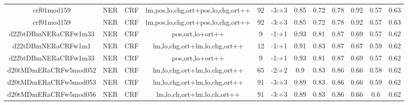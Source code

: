 \documentclass[a4paper]{article}
\begin{document}
\begin{landscape}
\begin{center}
\begin{tabular}{ |c|c|c|c|c|c|c|c|c|c|c|c|}
 	
 
 	
 		
 		\small{ crf01mod159 } & NER & CRF & lm,pos,lo,chg,ort+pos,lo,chg,ort++  &  92 &  -3:+3  &  0.85 & 0.72 & 0.78  &  0.92 & 0.57 & 0.63 \\
 		

 	
 
 	
 		
 		\small{ crf01mod159 } & NER & CRF & lm,pos,lo,chg,ort+pos,lo,chg,ort++  &  92 &  -3:+3  &  0.85 & 0.72 & 0.78  &  0.92 & 0.57 & 0.63 \\
 		

 	
 
 	
 		
 		\small{ d22btDBmNERaCRFw1m33 } & NER & CRF & pos,ort,lo+ort++  &  9 &  -1:+1  &  0.93 & 0.81 & 0.87  &  0.69 & 0.57 & 0.62 \\
 		

 	
 
 	
 		
 		\small{ d22tDBmNERaCRFw1m1 } & NER & CRF & lm,lo,chg,ort+lm,lo,chg,ort++  &  12 &  -1:+1  &  0.91 & 0.83 & 0.87  &  0.67 & 0.59 & 0.62 \\
 		

 	
 
 	
 		
 		\small{ d22btDBmNERaCRFw1m33 } & NER & CRF & pos,ort,lo+ort++  &  9 &  -1:+1  &  0.93 & 0.81 & 0.87  &  0.69 & 0.57 & 0.62 \\
 		

 	
 
 	
 		
 		\small{ d20tMDmERaCRFw5mod052 } & NER & CRF & lm,lo,chg,ort+lm,lo,chg,ort++  &  65 &  -2:+2  &  0.9 & 0.83 & 0.86  &  0.66 & 0.58 & 0.62 \\
 		

 	
 
 	
 		
 		\small{ d20tMDmERaCRFw5mod053 } & NER & CRF & lm,lo,chg,ort+lm,lo,chg,ort++  &  91 &  -3:+3  &  0.89 & 0.83 & 0.86  &  0.66 & 0.59 & 0.62 \\
 		

 	
 
 	
 		
 		\small{ d20tMDmERaCRFw5mod056 } & NER & CRF & lm,lo,ch,ort+lm,lo,ch,ort++  &  91 &  -3:+3  &  0.89 & 0.83 & 0.86  &  0.66 & 0.6 & 0.62 \\
 		
 \hline
\end{tabular}
\end{center}





\end{landscape}
\end{document}
